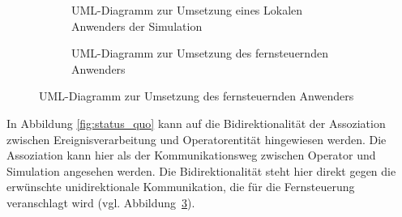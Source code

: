 \begin{figure}

\centering
\begin{subfigure}[b]{0.3\textwidth}
\centering
{}
\caption{UML-Diagramm zur Umsetzung eines Lokalen Anwenders der Simulation}
\label{fig:local}

\end{subfigure}
\begin{subfigure}[b]{0.3\textwidth}
\centering
{}
\caption{UML-Diagramm zur Umsetzung des fernsteuernden Anwenders}
\label{fig:remotecontrol_indiv}
\end{subfigure}
\label{fig:remotecontrol_design}
\end{figure}

In Abbildung \ref{fig:status_quo} kann auf die Bidirektionalität der Assoziation zwischen Ereignisverarbeitung und Operatorentität hingewiesen werden. Die Assoziation kann hier als der Kommunikationsweg zwischen Operator und Simulation angesehen werden. Die Bidirektionalität steht hier direkt gegen die erwünschte unidirektionale Kommunikation, die für die Fernsteuerung veranschlagt wird (vgl. Abbildung~\ref{fig:remotecontrol_design}).



